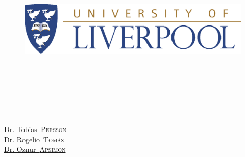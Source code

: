 \begin{titlepage}
\begin{center}

\vspace*{.06\textheight}
\vspace{1cm}
{\scshape\LARGE \univname\par} %
\vspace{0.8cm}

\begin{figure}[ht]
    \centering
    \includegraphics[width=\textwidth]{Figures/Logos/UoLlogo.eps}
\end{figure}

\HRule \\[0.4cm] %
{\huge \bfseries \ttitle\par}\vspace{0.4cm} %
\HRule \\[1cm] %

\vspace{1cm}

\begin{minipage}[t]{0.4\textwidth}
\begin{flushleft} \large
{}\\
\href{https://orcid.org/my-orcid?orcid=0000-0001-8012-1440}{\authorname} %
\end{flushleft}
\end{minipage}
\begin{minipage}[t]{0.4\textwidth}
\begin{flushright} \large
{}\\
\href{https://www.researchgate.net/profile/Tobias-Persson}{Dr. Tobias~\textsc{Persson}}\\
\href{https://orcid.org/0000-0002-9857-1703}{Dr. Rogelio~\textsc{Tomás}}\\
\href{https://orcid.org/0000-0002-5410-7706}{Dr. Oznur~\textsc{Apsimon}}\\
\href{https://orcid.org/0000-0001-7085-0973}{\supname}\\
\end{flushright}
\end{minipage}


\end{center}
\end{titlepage}
